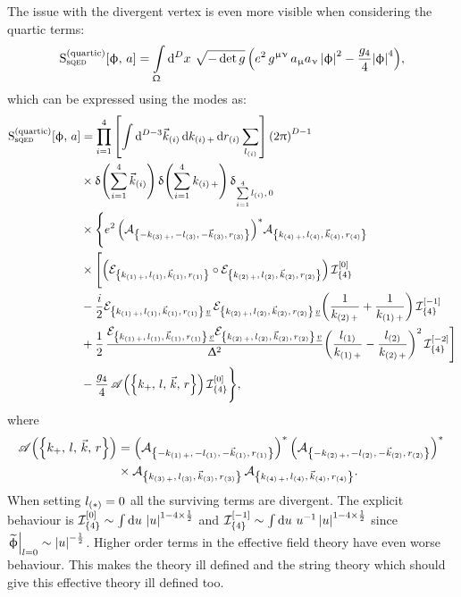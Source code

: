 The issue with the divergent vertex is even more visible when considering the quartic terms:
\begin{equation}
  \rS_{\text{s}\qed}^{(\text{quartic})}\qty[ \phi,\, a ]
  =
  \int\limits_{\Omega} \dd[D]{x}\,
  \sqrt{- \det g}\,
  \qty(%
    e^2\, g^{\mu\nu}\, a_{\mu} a_{\nu}\, \abs{\phi}^2
    -
    \frac{g_4}{4}\abs{\phi}^4
  ),
\end{equation}
which can be expressed using the modes as:
\begin{equation}
  \begin{split}
    \rS_{\text{s}\qed}^{(\text{quartic})}\qty[ \phi,\, a ]
    & =
    \finiteprod{i}{1}{4}
    \qty[%
      \int \dd[D-3]{\vec{k}_{\qty(i)}}
      \dd{k_{\qty(i)\, +}}
      \dd{r_{\qty(i)}}
      \sum_{l_{\qty(i)}}
    ]\,
    \qty(2\pi)^{D-1}
    \\
    & \times
    \delta\qty( \finitesum{i}{1}{4} \vec{k}_{\qty(i)} )\,
    \delta\qty( \finitesum{i}{1}{4} k_{\qty(i)\, +} )\,
    \delta_{\finitesum{i}{1}{4} l_{\qty(i)},\, 0}
    \\
    & \times
    \Biggl\lbrace
      e^2\,
      \qty(\cA_{\mkmkrN{3}})^* \cA_{\kmkrN{4}}
      \\
      & \times
      \Biggl[
       \qty(\genpolN{1} \circ \genpolN{2})\,
       \cI_{\qty{4}}^{\qty[0]}
        \\
        & -
        \frac{i}{2}
        \polN{v}{1}\, \polN{v}{2}
        \qty(%
          \frac{1 }{k_{\qty(2)\, +}}
          +
          \frac{1}{k_{\qty(1)\, +}}
        )\,
        \cI_{\qty{4}}^{\qty[-1]}
        \\
        & +
        \frac{1}{2}\,
        \frac{\polN{v}{1} \polN{v}{2} }{\Delta^2}
        \qty(%
          \frac{l_{\qty(1)}}{k_{\qty(1)\, +}}
          -
          \frac{l_{\qty(2)}}{k_{\qty(2)\, +}}
        )^2\,
        \cI_{\qty{4}}^{\qty[-2]}
      \Biggr]
      \\
      & -
      \frac{g_4}{4}\,
      \ccA\qty(\qty{k_+,\, l,\, \vec{k},\, r})\,
      \cI_{\qty{4}}^{\qty[0]}
    \Biggr\rbrace,
  \end{split}
\end{equation}
where
\begin{equation}
  \begin{split}
    \mathscr{A}\qty(\qty{k_+,\, l,\, \vec{k},\, r})
    & =
    \qty(\mathcal{A}_{\qty{-k_{\qty(1)\, +},\, -l_{\qty(1)},\, -\vec{k}_{\qty(1)},\, r_{\qty(1)}}})^*\,
    \qty(\mathcal{A}_{\qty{-k_{\qty(2)\, +},\, -l_{\qty(2)},\, -\vec{k}_{\qty(2)},\, r_{\qty(2)}}})^*\,
    \\
    & \times
    \mathcal{A}_{\qty{k_{\qty(3)\, +},\, l_{\qty(3)},\, \vec{k}_{\qty(3)},\, r_{\qty(3)}}}\,
    \mathcal{A}_{\qty{k_{\qty(4)\, +},\, l_{\qty(4)},\, \vec{k}_{\qty(4)},\, r_{\qty(4)}}}.
  \end{split}
\end{equation}
When setting $l_{\qty(*)} = 0$ all the surviving terms are divergent.
The explicit behaviour is $\mathcal{I}_{\qty{4}}^{\qty[0]} \sim \int \dd{u}\, \abs{u}^{1 -4 \times \frac{1}{2}}$ and $\mathcal{I}_{\qty{4}}^{\qty[-1]} \sim \int \dd{u}\, u^{-1}\, \abs{u}^{1 - 4 \times \frac{1}{2}}$ since $\eval{\tphi}_{l = 0} \sim \abs{u}^{-\frac{1}{2}}$.
Higher order terms in the effective field theory have even worse behaviour.
This makes the theory ill defined and the string theory which should give this effective theory ill defined too.


